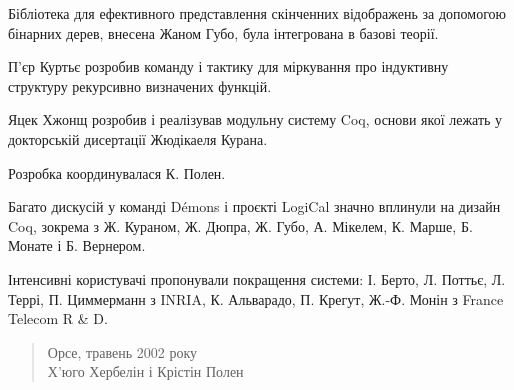 \documentclass{article}
\begin{document}
Бібліотека для ефективного представлення скінченних відображень за допомогою бінарних дерев, внесена Жаном Губо, була інтегрована в базові теорії.

П’єр Куртьє розробив команду і тактику для міркування про індуктивну структуру рекурсивно визначених функцій.

Яцек Хжонщ розробив і реалізував модульну систему Coq, основи якої лежать у докторській дисертації Жюдікаеля Курана.

Розробка координувалася К. Полен.

Багато дискусій у команді Démons і проєкті LogiCal значно вплинули на дизайн Coq, зокрема з Ж. Кураном, Ж. Дюпра, Ж. Губо, А. Мікелем, К. Марше, Б. Монате і Б. Вернером.

Інтенсивні користувачі пропонували покращення системи: І. Берто, Л. Поттьє, Л. Террі, П. Циммерманн з INRIA, К. Альварадо, П. Крегут, Ж.-Ф. Монін з France Telecom R \& D.

\begin{quote}
Орсе, травень 2002 року \\
Х’юго Хербелін і Крістін Полен
\end{quote}
\end{document}
